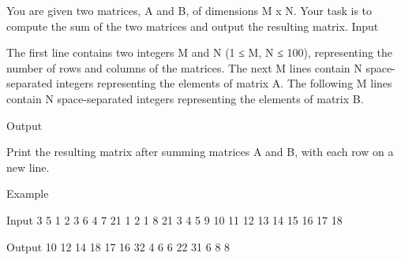 
You are given two matrices, A and B, of dimensions M x N. Your task is to compute the sum of the two matrices and output the resulting matrix.
Input

    The first line contains two integers M and N (1 ≤ M, N ≤ 100), representing the number of rows and columns of the matrices.
    The next M lines contain N space-separated integers representing the elements of matrix A.
    The following M lines contain N space-separated integers representing the elements of matrix B.

Output

    Print the resulting matrix after summing matrices A and B, with each row on a new line.

Example

Input
3 5
1 2 3 6 4
7 21 1 2 1
8 21 3 4 5
9 10 11 12 13
14 15 16 17 18

Output
10 12 14 18 17
16 32 4 6 6
22 31 6 8 8